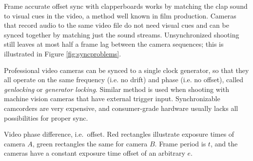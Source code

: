 Frame accurate offset sync with clapperboards works by matching the clap sound to visual cues in the video, a method well known in film production.
Cameras that record audio to the same video file do not need visual cues and can be synced together by matching just the sound streams.
Unsynchronized shooting still leaves at most half a frame lag between the camera sequences; this is illustrated in Figure \ref{fig:syncproblems}.

Professional video cameras can be synced to a single clock generator, so that they all operate on the same frequency (i.e. no drift) and phase (i.e. no offset), called \emph{genlocking} or \emph{generator locking}.
Similar method is used when shooting with machine vision cameras that have external trigger input.
\cite{poynton1996technical}
Synchronizable camcorders are very expensive, and consumer-grade hardware usually lacks all possibilities for proper sync.

%
%
%
%


{Video phase difference, i.e.~offset.
Red rectangles illustrate exposure times of camera $A$, green rectangles the same for camera $B$.
Frame period is $t$, and the cameras have a constant exposure time offset of an arbitrary $e$.}


